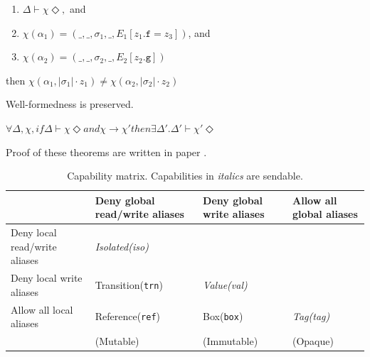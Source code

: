 \documentclass{article}
\begin{document}
\begin{multicols}{2}
\begin{theorem}
	\begin{enumerate}
		\item $\Delta \vdash \chi \Diamond,$ and
		\item $\chi(\alpha_1) = (\_,\_,\sigma_1, \_,  E_1[z_1.\texttt{f} = z_3])$, and
		\item $\chi(\alpha_2) = (\_,\_,\sigma_2, \_,  E_2[z_2.\texttt{g}])$
	\end{enumerate} 
	
	then $\chi(\alpha_1, |\sigma_1|\cdot z_1) \neq \chi(\alpha_2, |\sigma_2| \cdot z_2)$
\end{theorem}

\begin{theorem} 
	Well-formedness is preserved.
	
	$\forall \Delta, \chi, if \Delta \vdash \chi \Diamond and \chi \rightarrow \chi' then  \exists \Delta'.\Delta' \vdash \chi'\Diamond$
\end{theorem}

Proof of these theorems are written in paper \cite{type-proof-paper}.


\begin{table}[]
\begin{tabularx}{\textwidth}{|X|X|X|X|}
 \hline
 & Deny global read/write aliases & Deny global write aliases & Allow all global aliases \\  \hline
Deny local read/write aliases & \textit{Isolated(iso) }    &                           &                        \\  \hline
Deny local write aliases      & Transition(\texttt{trn})                & \textit{Value(val)  }              &                        \\  \hline
Allow all local aliases       & Reference(\texttt{ref})                 & Box(\texttt{box})                  & \textit{Tag(tag)  }             \\  \hline
                              & (Mutable)                      & (Immutable)               & (Opaque)   \\ \hline           
\end{tabularx}
\caption{Capability matrix. Capabilities in \textit{italics} are sendable.\cite{type-proof-paper} }
\end{table}


\end{multicols}
\end{document}
